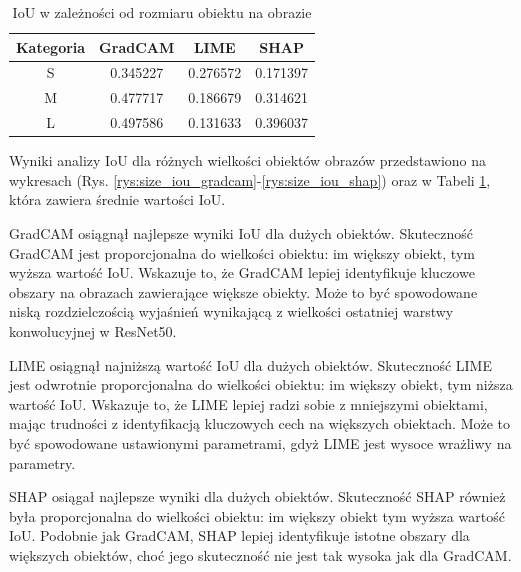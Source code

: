 \begin{table}
	\centering
	\begin{tabular}{|c|c|c|c|}
		\hline
		\textbf{Kategoria} & \textbf{GradCAM} & \textbf{LIME} & \textbf{SHAP} \\
		\hline
		S                  & 0.345227         & 0.276572      & 0.171397      \\
		\hline
		M                  & 0.477717         & 0.186679      & 0.314621      \\
		\hline
		L                  & 0.497586         & 0.131633      & 0.396037      \\
		\hline
	\end{tabular}
	\caption{IoU w zależności od rozmiaru obiektu na obrazie}
	\label{tab:size_iou}
\end{table}

Wyniki analizy IoU dla różnych wielkości obiektów obrazów przedstawiono na wykresach (Rys. \ref{rys:size_iou_gradcam}-\ref{rys:size_iou_shap}) oraz w Tabeli \ref{tab:size_iou}, która zawiera średnie wartości IoU.

GradCAM osiągnął najlepsze wyniki IoU dla dużych obiektów.
Skuteczność GradCAM jest proporcjonalna do wielkości obiektu: im większy obiekt, tym wyższa wartość IoU.
Wskazuje to, że GradCAM lepiej identyfikuje kluczowe obszary na obrazach zawierające większe obiekty.
Może to być spowodowane niską rozdzielczością wyjaśnień wynikającą z wielkości ostatniej warstwy konwolucyjnej w ResNet50.

LIME osiągnął najniższą wartość IoU dla dużych obiektów.
Skuteczność LIME jest odwrotnie proporcjonalna do wielkości obiektu:  im większy obiekt, tym niższa wartość IoU.
Wskazuje to, że LIME lepiej radzi sobie z mniejszymi obiektami, mając trudności z identyfikacją kluczowych cech na większych obiektach.
Może to być spowodowane ustawionymi parametrami, gdyż LIME jest wysoce wrażliwy na parametry.

SHAP osiągał najlepsze wyniki dla dużych obiektów.
Skuteczność SHAP również była proporcjonalna do wielkości obiektu: im większy obiekt tym wyższa wartość IoU.
Podobnie jak GradCAM, SHAP lepiej identyfikuje istotne obszary dla większych obiektów, choć jego skuteczność nie jest tak wysoka jak dla GradCAM.

